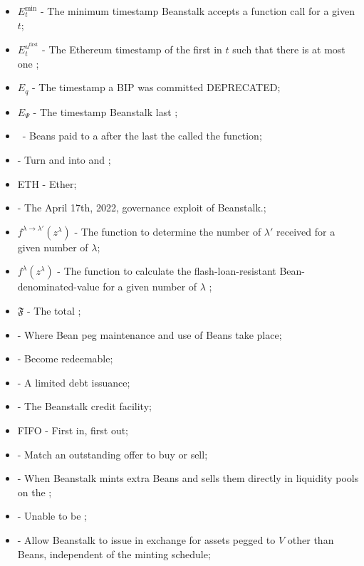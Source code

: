 \documentclass[class=article, crop=false]{standalone}
\begin{document}
\begin{itemize}[topsep=0pt, itemsep=3pt,leftmargin=16pt]
    \item[] $E_{t}^{\text{min}}$ - The minimum timestamp Beanstalk accepts a  function call for a given $t$;
    \item[] $E_{t}^{u^{\text{first}}}$ - The Ethereum timestamp of the first  in $t$ such that there is at most one ;
    \item[] $E_q$ - The timestamp a BIP was committed DEPRECATED;
    \item[] $E_{\Psi}$ - The timestamp Beanstalk last ;
    \item[]  \Bean\ - Beans paid to a  after the last  the  called the  function;
    \item[]  - Turn   and   into  and ;
    \item[] ETH - Ether;
    \item[]  - The April 17th, 2022, governance exploit of Beanstalk.;
    \item[] $f^{\lambda \rightarrow \lambda'}(z^{\lambda})$ - The function to determine the number of $\lambda'$ received for  a given number of $\lambda$;
    \item[] $f^{\lambda}(z^{\lambda})$ - The function to calculate the flash-loan-resistant Bean-denominated-value for a given number of $\lambda$ ;
    \item[] $\mathfrak{F}$ - The total ;
    \item[]  - Where Bean peg maintenance and use of Beans take place;
    \item[]  - Become redeemable;
    \item[]  - A limited debt issuance;
    \item[]  - The Beanstalk credit facility;
    \item[] FIFO - First in, first out;
    \item[]  - Match an outstanding offer to buy or sell;
    \item[]  - When Beanstalk mints extra Beans and sells them directly in liquidity pools on the  ;
    \item[]  - Unable to be ;
    \item[]  - Allow Beanstalk to issue  in exchange for assets pegged to $V$ other than Beans, independent of the  minting schedule;

\end{itemize}
\end{document}
